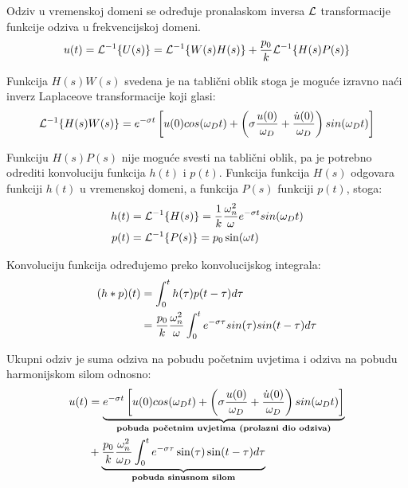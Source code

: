 Odziv u vremenskoj domeni se određuje pronalaskom inversa $\mathcal{L}$ transformacije
funkcije odziva u frekvencijskoj domeni.
\begin{equation}
	u(t)=\mathcal{L}^{-1}\{U(s)\}=\mathcal{L}^{-1}\{W(s)H(s)\}+\frac{p_0}{k}\mathcal{L}^{-1}\{H(s)P(s)\}
	\label{eq:inverz_prvi_korak}
\end{equation}

Funkcija $H(s)W(s)$ svedena je na tablični oblik stoga je moguće izravno naći inverz
Laplaceove transformacije koji glasi:
\begin{equation}
	\mathcal{L}^{-1}\{H(s)W(s)\} = e^{-\sigma t}\left[
		u(0)cos(\omega_Dt)+\left(
			\sigma\frac{u(0)}{\omega_D}+\frac{\dot{u}(0)}{\omega_D}
			\right)sin(\omega_Dt)\right] \label{eq:pobuda_pocetnim_uvjetima}
\end{equation}

Funkciju $H(s)P(s)$ nije moguće svesti na tablični oblik, pa je potrebno odrediti
konvoluciju funkcija $h(t)$ i $p(t)$. Funkcija funkcija $H(s)$ odgovara funkciji 
$h(t)$ u vremenskoj domeni, a funkcija $P(s)$ funkciji $p(t)$, stoga:
\begin{align}
        h(t)&=\mathcal{L}^{-1}\{H(s)\}=\frac{1}{k}\frac{\omega_n^2}{\omega}e^{-\sigma t}sin(\omega_Dt)\label{eq:pfs_vremenska_domena}\\
	p(t)&=\mathcal{L}^{-1}\{P(s)\}=p_0\sin(\omega t) \label{eq:pobuda_vremenska_domena}
\end{align}

Konvoluciju funkcija određujemo preko konvolucijskog integrala:
\begin{align}\label{eq:konvolucijski_integral}
	(h*p)(t)&=\int_0^th(\tau)p(t-\tau)d\tau \notag\\
		&=\frac{p_0}{k}\frac{\omega_n^2}{\omega}
		\int_0^te^{-\sigma\tau}sin(\tau)sin(t-\tau)d\tau
\end{align}

Ukupni odziv je suma odziva na pobudu početnim uvjetima i odziva na pobudu
harmonijskom silom odnosno:
\begin{equation}
    \begin{split}
    u(t)&=\underbrace{e^{-\sigma t}\left[
		u(0)cos(\omega_Dt)+\left(
                        \sigma\frac{u(0)}{\omega_D}+\frac{\dot{u}(0)}{\omega_D}
                        \right)sin(\omega_Dt) \right]}_{\text{\textbf{pobuda
                    početnim uvjetima (prolazni dio odziva)}}}\\
                    &+\underbrace{
                        \frac{p_0}{k}
                        \frac{\omega_n^2}{\omega_D}
                        \int_0^te^{-\sigma\tau}\sin(\tau)\sin(t-\tau)d\tau
                    }_{\text{\textbf{pobuda sinusnom silom}}}
    \end{split}
    \label{eq:inverz_drugi_korak}
\end{equation}

